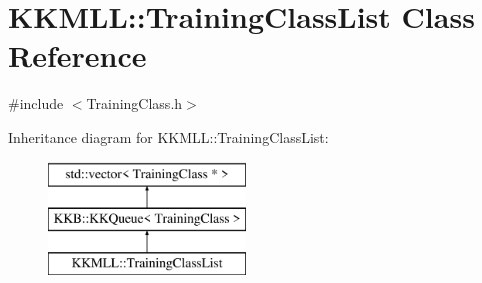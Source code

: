 \hypertarget{class_k_k_m_l_l_1_1_training_class_list}{}\section{K\+K\+M\+LL\+:\+:Training\+Class\+List Class Reference}
\label{class_k_k_m_l_l_1_1_training_class_list}


{\ttfamily \#include $<$Training\+Class.\+h$>$}

Inheritance diagram for K\+K\+M\+LL\+:\+:Training\+Class\+List\+:\begin{figure}[H]
\begin{center}
\leavevmode
\includegraphics[height=3.000000cm]{class_k_k_m_l_l_1_1_training_class_list}
\end{center}
\end{figure}
